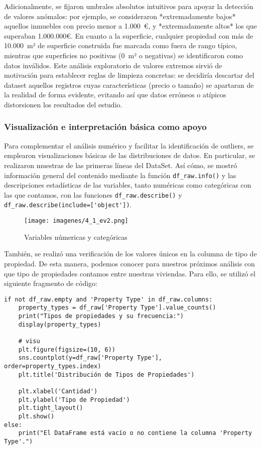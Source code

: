 \documentclass[a4paper,11pt]{book}
\begin{document}
Adicionalmente, se fijaron umbrales absolutos intuitivos para apoyar la detección de valores anómalos: por ejemplo, se consideraron *extremadamente bajos* aquellos inmuebles con precio menor a 1.000 €, y *extremadamente altos* los que superaban 1.000.000€. En cuanto a la superficie, cualquier propiedad con más de 10.000 m² de superficie construida fue marcada como fuera de rango típico, mientras que superficies no positivas (0 m² o negativas) se identificaron como datos inválidos. Este análisis exploratorio de valores extremos sirvió de motivación para establecer reglas de limpieza concretas: se decidiría descartar del dataset aquellos registros cuyas características (precio o tamaño) se apartaran de la realidad de forma evidente, evitando así que datos erróneos o atípicos distorsionen los resultados del estudio.

\subsubsection{Visualización e interpretación básica como apoyo}
Para complementar el análisis numérico y facilitar la identificación de outliers, se emplearon visualizaciones básicas de las distribuciones de datos. En particular, se realizaron muestras de las primeras líneas del DataSet. Así cómo, se mostró información general del contenido mediante la función \texttt{df\_raw.info()} y las descripciones estadísticas de las variables, tanto numéricas como categóricas con las que contamos, con las funciones \verb|df_raw.describe()| y \verb|df_raw.describe(include=['object'])|.

\begin{figure}
    \centering
    \texttt{[image: imagenes/4\_1\_ev2.png]}
    \caption{Variables númericas y categóricas}
    \label{fig:var_num_categ}
\end{figure}


También, se realizó una verificación de los valores únicos en la columna de tipo de propiedad. De esta manera, podemos conocer para nuestros próximos análisis con que tipo de propiedades contamos entre nuestras viviendas. Para ello, se utilizó el siguiente fragmento de código:

\begin{lstlisting}
if not df_raw.empty and 'Property Type' in df_raw.columns:
    property_types = df_raw['Property Type'].value_counts()
    print("Tipos de propiedades y su frecuencia:")
    display(property_types)
    
    # visu
    plt.figure(figsize=(10, 6))
    sns.countplot(y=df_raw['Property Type'], order=property_types.index)
    plt.title('Distribución de Tipos de Propiedades')
    
    plt.xlabel('Cantidad')
    plt.ylabel('Tipo de Propiedad')
    plt.tight_layout()
    plt.show()
else:
    print("El DataFrame está vacío o no contiene la columna 'Property Type'.")
\end{lstlisting}
\end{document}
